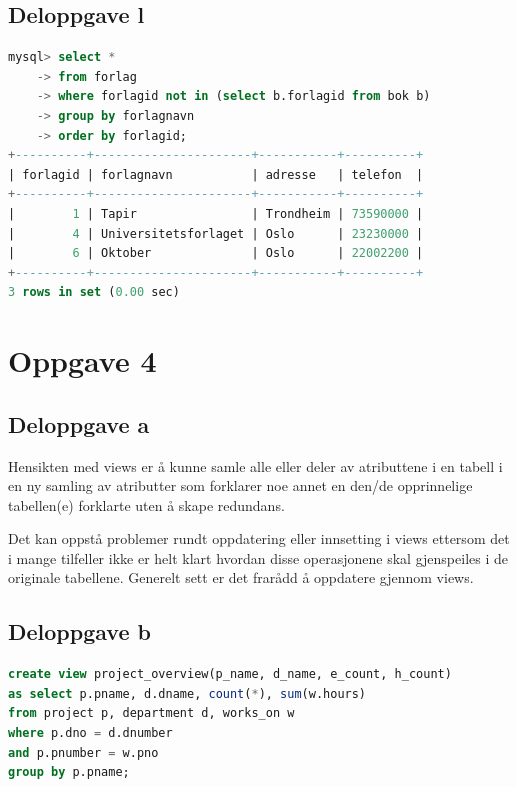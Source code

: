\documentclass[a4paper, 12pt] {article}
\begin{document}
\subsection{Deloppgave l}

\begin{lstlisting}[language=SQL, label=oppg3l, caption=Oppgave 3l]
mysql> select *
    -> from forlag
    -> where forlagid not in (select b.forlagid from bok b)
    -> group by forlagnavn
    -> order by forlagid;
+----------+----------------------+-----------+----------+
| forlagid | forlagnavn           | adresse   | telefon  |
+----------+----------------------+-----------+----------+
|        1 | Tapir                | Trondheim | 73590000 |
|        4 | Universitetsforlaget | Oslo      | 23230000 |
|        6 | Oktober              | Oslo      | 22002200 |
+----------+----------------------+-----------+----------+
3 rows in set (0.00 sec)
\end{lstlisting}

\section{Oppgave 4}

\subsection{Deloppgave a}


Hensikten med views er å kunne samle alle eller deler av atributtene i en tabell i en ny samling av atributter som forklarer noe annet en den/de opprinnelige tabellen(e) forklarte uten å skape redundans.


Det kan oppstå problemer rundt oppdatering eller innsetting i views ettersom det i mange tilfeller ikke er helt klart hvordan disse operasjonene skal gjenspeiles i de originale tabellene. Generelt sett er det frarådd å oppdatere gjennom views.


\subsection{Deloppgave b}

\begin{lstlisting}[language=SQL, label=oppg4b, caption=Oppgave 4b]
create view project_overview(p_name, d_name, e_count, h_count)
as select p.pname, d.dname, count(*), sum(w.hours)
from project p, department d, works_on w
where p.dno = d.dnumber
and p.pnumber = w.pno
group by p.pname;
\end{lstlisting}
\end{document}
